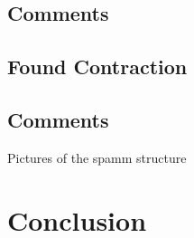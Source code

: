 \documentclass[letterpaper,twocolumn,amsmath,amsfont,amssymb,english,aps,jcp,preprintnumbers,groupaddress,nofootinbib,tightenlines]{revtex4}
\begin{document}
\subsection{Comments}

\subsection{Found Contraction}

\subsection{Comments}
Pictures of the spamm structure

\section{Conclusion}



\end{document}
